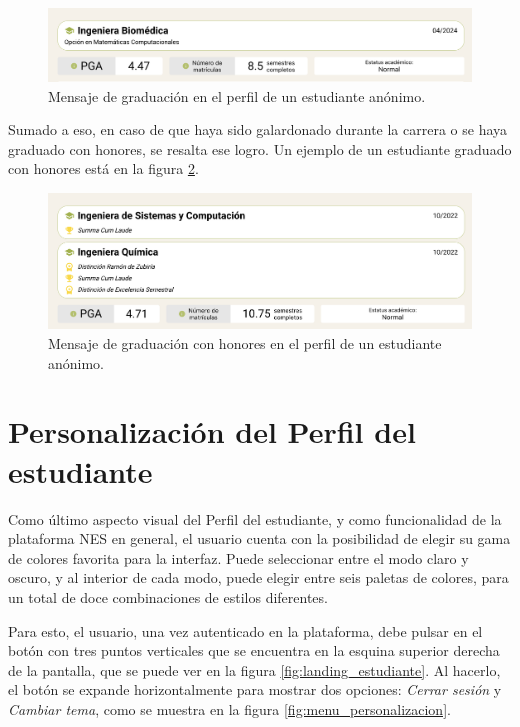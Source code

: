 \begin{figure}[H]
	\includegraphics[width=\textwidth]{assets/nes/graduado.png}
	\caption{Mensaje de graduación en el perfil de un estudiante anónimo.}
	\label{fig:graduado}
\end{figure}

Sumado a eso, en caso de que haya sido galardonado durante la carrera o se haya graduado con honores, se resalta ese logro. Un ejemplo de un estudiante graduado con honores está en la figura \ref{fig:graduado_honores}.

\begin{figure}[H]
	\includegraphics[width=\textwidth]{assets/nes/graduado_honores.png}
	\caption{Mensaje de graduación con honores en el perfil de un estudiante anónimo.}
	\label{fig:graduado_honores}
\end{figure}


\section{Personalización del Perfil del estudiante}

Como último aspecto visual del Perfil del estudiante, y como funcionalidad de la plataforma \gls{NES} en general, el usuario cuenta con la posibilidad de elegir su gama de colores favorita para la interfaz. Puede seleccionar entre el modo claro y oscuro, y al interior de cada modo, puede elegir entre seis paletas de colores, para un total de doce combinaciones de estilos diferentes.

Para esto, el usuario, una vez autenticado en la plataforma, debe pulsar en el botón con tres puntos verticales que se encuentra en la esquina superior derecha de la pantalla, que se puede ver en la figura \ref{fig:landing_estudiante}. Al hacerlo, el botón se expande horizontalmente para mostrar dos opciones: \textit{Cerrar sesión} y \textit{Cambiar tema}, como se muestra en la figura \ref{fig:menu_personalizacion}.

